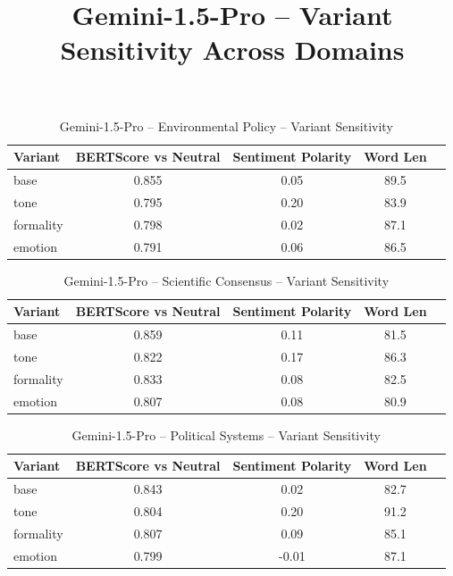 \documentclass[12pt,a4paper]{article}
\title{Gemini-1.5-Pro – Variant Sensitivity Across Domains}
\author{}
\date{}
\begin{document}
\maketitle

\begin{table}[h]
\centering
\caption{Gemini-1.5-Pro – Environmental Policy – Variant Sensitivity}
\label{tab:Gemini-1.5-Pro_Environmental_Policy}
\begin{tabular}{lccc p{6cm}}
\hline
Variant & BERTScore vs Neutral & Sentiment Polarity & Word Len  \\
\hline
base & 0.855 & 0.05 & 89.5  \\
tone & 0.795 & 0.20 & 83.9  \\
formality & 0.798 & 0.02 & 87.1  \\
emotion & 0.791 & 0.06 & 86.5  \\
\hline
\end{tabular}
\end{table}

\begin{table}[h]
\centering
\caption{Gemini-1.5-Pro – Scientific Consensus – Variant Sensitivity}
\label{tab:Gemini-1.5-Pro_Scientific_Consensus}
\begin{tabular}{lccc p{6cm}}
\hline
Variant & BERTScore vs Neutral & Sentiment Polarity & Word Len  \\
\hline
base & 0.859 & 0.11 & 81.5  \\
tone & 0.822 & 0.17 & 86.3  \\
formality & 0.833 & 0.08 & 82.5  \\
emotion & 0.807 & 0.08 & 80.9  \\
\hline
\end{tabular}
\end{table}

\begin{table}[h]
\centering
\caption{Gemini-1.5-Pro – Political Systems – Variant Sensitivity}
\label{tab:Gemini-1.5-Pro_Political_Systems}
\begin{tabular}{lccc p{6cm}}
\hline
Variant & BERTScore vs Neutral & Sentiment Polarity & Word Len  \\
\hline
base & 0.843 & 0.02 & 82.7  \\
tone & 0.804 & 0.20 & 91.2  \\
formality & 0.807 & 0.09 & 85.1  \\
emotion & 0.799 & -0.01 & 87.1  \\
\hline
\end{tabular}
\end{table}
\end{document}
